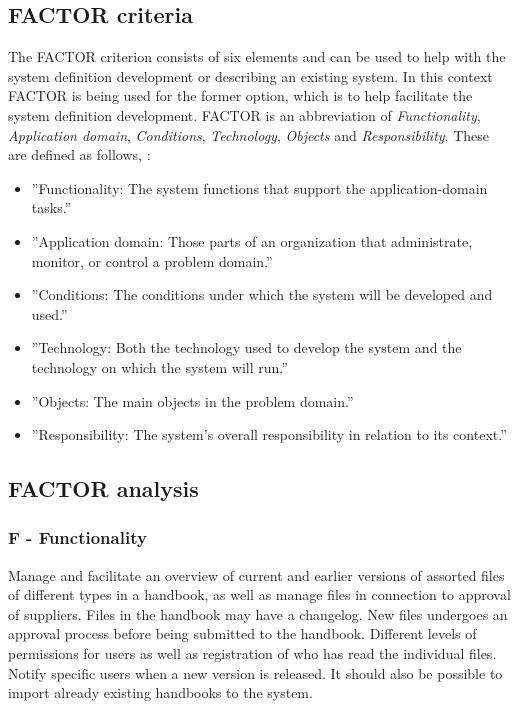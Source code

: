 \subsection{FACTOR criteria} \label{sec:factorcriteria}
The FACTOR criterion consists of six elements and can be used to help with the system definition development or describing an existing system.
In this context FACTOR is being used for the former option, which is to help facilitate the system definition development.
FACTOR is an abbreviation of \textit{Functionality}, \textit{Application domain}, \textit{Conditions}, \textit{Technology}, \textit{Objects} and \textit{Responsibility}.
These are defined as follows, \citep[p.~40]{Rod-Aalborg}:
\begin{itemize}
	\item
		''Functionality:
		The system functions that support the application-domain tasks.''
	\item
		''Application domain:
		Those parts of an organization that administrate, monitor, or control a problem domain.''
	\item
		''Conditions:
		The conditions under which the system will be developed and used.''
	\item
		''Technology:
		Both the technology used to develop the system and the technology on which the system will run.''
	\item
		''Objects:
		The main objects in the problem domain.''
	\item
		''Responsibility:
		The system’s overall responsibility in relation to its context.''
\end{itemize}

\subsection{FACTOR analysis}\label{factor}

\subsubsection*{F - Functionality}
Manage and facilitate an overview of current and earlier versions of assorted files of different types in a handbook, as well as manage files in connection to approval of suppliers.
Files in the handbook may have a changelog.
New files undergoes an approval process before being submitted to the handbook.
Different levels of permissions for users as well as registration of who has read the individual files.
Notify specific users when a new version is released.
It should also be possible to import already existing handbooks to the system.

